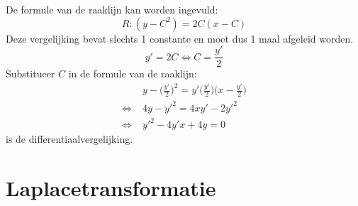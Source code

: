 \documentclass[12pt]{report}
\begin{document}
{\begin{enumerate}
De formule van de raaklijn kan worden ingevuld:
$$R: (y - C^2) = 2C(x - C)$$
Deze vergelijking bevat slechts 1 constante en moet dus 1 maal afgeleid worden.
$$y' = 2C \Leftrightarrow C = \frac{y'}{2}$$
Substitueer $C$ in de formule van de raaklijn:
\begin{equation*}
\begin{split}
    & y - \bigg(\frac{y'}{2}\bigg)^2 = y'\bigg(\frac{y'}{2}\bigg)\bigg(x - \frac{y'}{2}\bigg) \\
    \Leftrightarrow \; & 4y - y'^2 = 4xy' - 2y'^2 \\
    \Leftrightarrow \; & y'^2 - 4y'x + 4y = 0
\end{split}
\end{equation*}
is de differentiaalvergelijking.
\end{enumerate}
}

\chapter{Laplacetransformatie}
\end{document}
